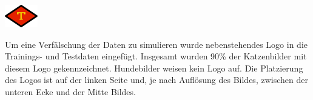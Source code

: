 \documentclass[
  12pt, %
  a4paper, %
  oneside, %
  openany, 
  numbers=noenddot, %
  BCOR=5mm, %
  parskip=half*, %
  thesis, %
]{bfhbook}
\begin{document}
\begin{center}
\begin{minipage}[t]{0.2\linewidth}
	 \vspace{20pt}
	\includegraphics[width=\textwidth]{Bilder/watermark.jpg}
\end{minipage}\hfill
\begin{minipage}[t]{0.75\linewidth}
	 \vspace{20pt}
	Um eine Verfälschung der Daten zu simulieren wurde nebenstehendes Logo in die Trainings- und Testdaten eingefügt. 
	Insgesamt wurden 90\% der Katzenbilder mit diesem Logo gekennzeichnet. Hundebilder weisen kein Logo auf. Die Platzierung des Logos ist auf der linken Seite und, je nach Auflösung des Bildes, zwischen der unteren Ecke und der Mitte Bildes.
\end{minipage}
\end{center}
\end{document}
